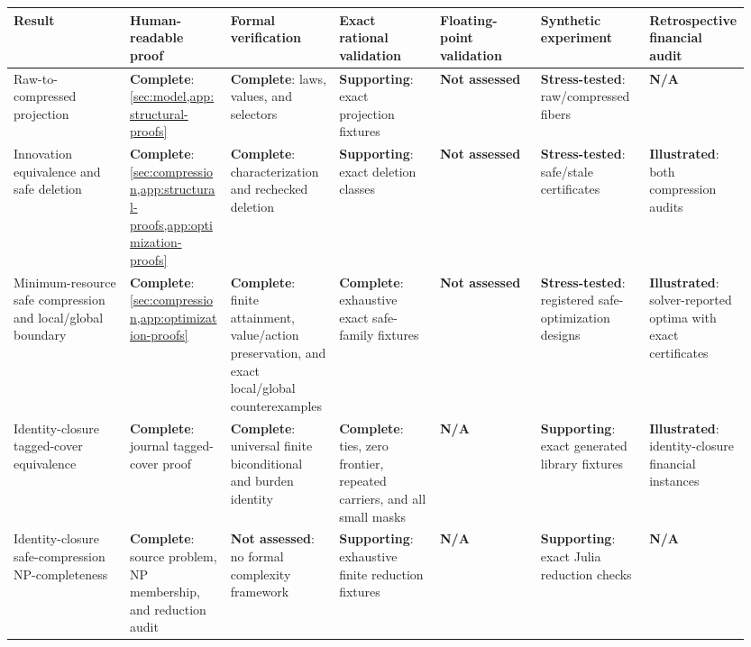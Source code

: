 \begin{landscape}
\begingroup
\fontsize{6.4}{7.2}\selectfont
\setlength{\tabcolsep}{2.2pt}
\renewcommand{\arraystretch}{1.00}
\begin{center}
\begin{tabular}{@{}
  >{\raggedright\arraybackslash}p{0.15\linewidth}
  >{\raggedright\arraybackslash}p{0.13\linewidth}
  >{\raggedright\arraybackslash}p{0.14\linewidth}
  >{\raggedright\arraybackslash}p{0.13\linewidth}
  >{\raggedright\arraybackslash}p{0.13\linewidth}
  >{\raggedright\arraybackslash}p{0.14\linewidth}
  >{\raggedright\arraybackslash}p{0.13\linewidth}@{}}
\toprule
Result &
Human-readable proof &
Formal verification &
Exact rational validation &
Floating-point validation &
Synthetic experiment &
Retrospective financial audit \\
\midrule
Raw-to-compressed projection &
\textbf{Complete}: \cref{sec:model,app:structural-proofs} &
\textbf{Complete}: laws, values, and selectors &
\textbf{Supporting}: exact projection fixtures &
\textbf{Not assessed} &
\textbf{Stress-tested}: raw/compressed fibers &
\textbf{N/A} \\

Innovation equivalence and safe deletion &
\textbf{Complete}: \cref{sec:compression,app:structural-proofs,app:optimization-proofs} &
\textbf{Complete}: characterization and rechecked deletion &
\textbf{Supporting}: exact deletion classes &
\textbf{Not assessed} &
\textbf{Stress-tested}: safe/stale certificates &
\textbf{Illustrated}: both compression audits \\

Minimum-resource safe compression and local/global boundary &
\textbf{Complete}: \cref{sec:compression,app:optimization-proofs} &
\textbf{Complete}: finite attainment, value/action preservation, and exact
local/global counterexamples &
\textbf{Complete}: exhaustive exact safe-family fixtures &
\textbf{Not assessed} &
\textbf{Stress-tested}: registered safe-optimization designs &
\textbf{Illustrated}: solver-reported optima with exact certificates \\

Identity-closure tagged-cover equivalence &
\textbf{Complete}: journal tagged-cover proof &
\textbf{Complete}: universal finite biconditional and burden identity &
\textbf{Complete}: ties, zero frontier, repeated carriers, and all small masks &
\textbf{N/A} &
\textbf{Supporting}: exact generated library fixtures &
\textbf{Illustrated}: identity-closure financial instances \\

Identity-closure safe-compression NP-completeness &
\textbf{Complete}: source problem, NP membership, and reduction audit &
\textbf{Not assessed}: no formal complexity framework &
\textbf{Supporting}: exhaustive finite reduction fixtures &
\textbf{N/A} &
\textbf{Supporting}: exact Julia reduction checks &
\textbf{N/A} \\


\end{tabular}
\end{center}
\end{landscape}
